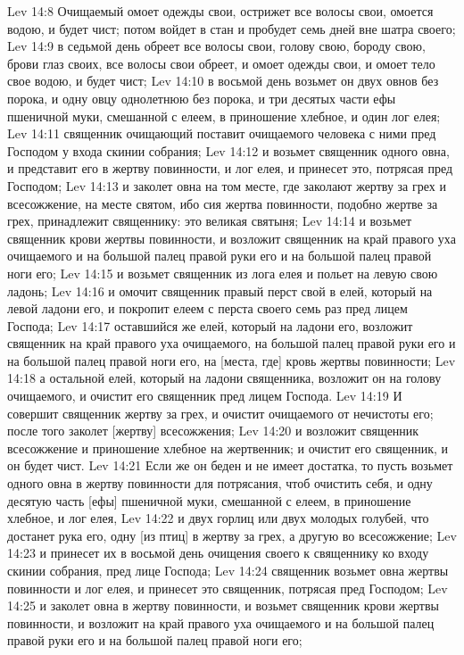 Lev 14:8  Очищаемый омоет одежды свои, острижет все волосы свои, омоется водою, и будет чист; потом войдет в стан и пробудет семь дней вне шатра своего;
Lev 14:9  в седьмой день обреет все волосы свои, голову свою, бороду свою, брови глаз своих, все волосы свои обреет, и омоет одежды свои, и омоет тело свое водою, и будет чист;
Lev 14:10  в восьмой день возьмет он двух овнов без порока, и одну овцу однолетнюю без порока, и три десятых части ефы пшеничной муки, смешанной с елеем, в приношение хлебное, и один лог елея;
Lev 14:11  священник очищающий поставит очищаемого человека с ними пред Господом у входа скинии собрания;
Lev 14:12  и возьмет священник одного овна, и представит его в жертву повинности, и лог елея, и принесет это, потрясая пред Господом;
Lev 14:13  и заколет овна на том месте, где заколают жертву за грех и всесожжение, на месте святом, ибо сия жертва повинности, подобно жертве за грех, принадлежит священнику: это великая святыня;
Lev 14:14  и возьмет священник крови жертвы повинности, и возложит священник на край правого уха очищаемого и на большой палец правой руки его и на большой палец правой ноги его;
Lev 14:15  и возьмет священник из лога елея и польет на левую свою ладонь;
Lev 14:16  и омочит священник правый перст свой в елей, который на левой ладони его, и покропит елеем с перста своего семь раз пред лицем Господа;
Lev 14:17  оставшийся же елей, который на ладони его, возложит священник на край правого уха очищаемого, на большой палец правой руки его и на большой палец правой ноги его, на [места, где] кровь жертвы повинности;
Lev 14:18  а остальной елей, который на ладони священника, возложит он на голову очищаемого, и очистит его священник пред лицем Господа.
Lev 14:19  И совершит священник жертву за грех, и очистит очищаемого от нечистоты его; после того заколет [жертву] всесожжения;
Lev 14:20  и возложит священник всесожжение и приношение хлебное на жертвенник; и очистит его священник, и он будет чист.
Lev 14:21  Если же он беден и не имеет достатка, то пусть возьмет одного овна в жертву повинности для потрясания, чтоб очистить себя, и одну десятую часть [ефы] пшеничной муки, смешанной с елеем, в приношение хлебное, и лог елея,
Lev 14:22  и двух горлиц или двух молодых голубей, что достанет рука его, одну [из птиц] в жертву за грех, а другую во всесожжение;
Lev 14:23  и принесет их в восьмой день очищения своего к священнику ко входу скинии собрания, пред лице Господа;
Lev 14:24  священник возьмет овна жертвы повинности и лог елея, и принесет это священник, потрясая пред Господом;
Lev 14:25  и заколет овна в жертву повинности, и возьмет священник крови жертвы повинности, и возложит на край правого уха очищаемого и на большой палец правой руки его и на большой палец правой ноги его;

